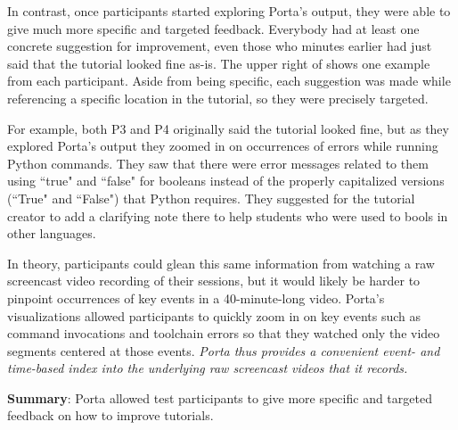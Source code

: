 In contrast, once participants started exploring Porta's output, they
were able to give much more specific and targeted feedback. Everybody
had at least one concrete suggestion for improvement, even those who
minutes earlier had just said that the tutorial looked fine as-is. The
upper right of  shows one example from each
participant. Aside from being specific, each suggestion was made while
referencing a specific location in the tutorial, so they were precisely
targeted.

For example, both P3 and P4 originally said the tutorial looked fine,
but as they explored Porta's output they zoomed in on occurrences of
errors while running Python commands. They saw that there were error
messages related to them using ``true" and ``false" for booleans instead
of the properly capitalized versions (``True" and ``False") that Python
requires. They suggested for the tutorial creator to add a clarifying
note there to help students who were used to bools in other languages.

In theory, participants could glean this same information from watching
a raw screencast video recording of their sessions, but it would likely
be harder to pinpoint occurrences of key events in a 40-minute-long
video. Porta's visualizations allowed participants to quickly zoom in on
key events such as command invocations and toolchain errors so that they
watched only the video segments centered at those events. \emph{Porta thus
provides a convenient event- and time-based index into the underlying
raw screencast videos that it records.}

\begin{mynote}

\textbf{Summary}: Porta allowed test participants to give more specific
and targeted feedback on how to improve tutorials.

\end{mynote}




